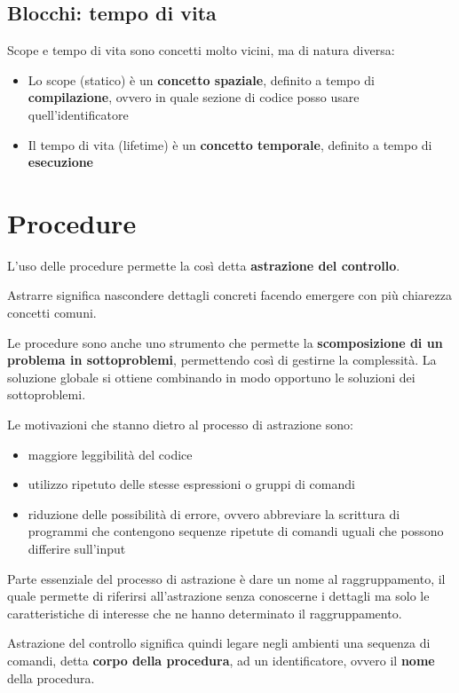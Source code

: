 \documentclass[12pt,a4paper]{article}
\begin{document}
\subsection{Blocchi: tempo di vita}
Scope e tempo di vita sono concetti molto vicini, ma di natura diversa:
\begin{itemize}
\item Lo scope (statico) è un \textbf{concetto spaziale}, definito a tempo di \textbf{compilazione}, ovvero in quale sezione di codice posso usare quell'identificatore
\item Il tempo di vita (lifetime) è un \textbf{concetto temporale}, definito a tempo di \textbf{esecuzione}
\end{itemize}

\section{Procedure}
L'uso delle procedure permette la così detta \textbf{astrazione del controllo}.

Astrarre significa nascondere dettagli concreti facendo emergere con più
chiarezza concetti comuni.

Le procedure sono anche uno strumento che permette la
\textbf{scomposizione di un problema in sottoproblemi}, permettendo così di gestirne la
complessità. La soluzione globale si ottiene combinando in modo opportuno le
soluzioni dei sottoproblemi.

Le motivazioni che stanno dietro al processo di astrazione sono:
\begin{itemize}
\item maggiore leggibilità del codice
\item utilizzo ripetuto delle stesse espressioni o gruppi di comandi
\item riduzione delle possibilità di errore, ovvero abbreviare la scrittura di programmi che contengono sequenze ripetute di comandi uguali che possono differire sull'input
\end{itemize}

Parte essenziale del processo di astrazione è dare un nome al raggruppamento, il quale permette di riferirsi all'astrazione senza conoscerne i dettagli ma solo le caratteristiche di interesse che ne hanno determinato il raggruppamento.

Astrazione del controllo significa quindi legare negli ambienti una sequenza di comandi, detta \textbf{corpo della procedura}, ad un identificatore, ovvero il \textbf{nome} della procedura.
\end{document}
